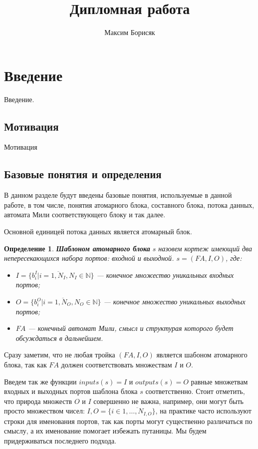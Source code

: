 \documentclass[10pt,a4paper]{article}
\author{Максим Борисяк}
\title{Дипломная работа}
\newtheorem{defen}{Определение}
\newcommand{\FA}{F\!A}
\begin{document}
\maketitle

\section{Введение}

Введение.

\subsection{Мотивация}
Мотивация

\subsection{Базовые понятия и определения}
В данном разделе будут введены базовые понятия, используемые в данной работе, в том числе,
понятия атомарного блока, составного блока, потока данных, автомата Мили соответствующего блоку и так далее.

Основной единицей потока данных является атомарный блок.
\begin{defen}
  \textbf{Шаблоном атомарного блока} $s$ назовем кортеж имеющий два непересекающихся набора портов: \textit{входной} и \textit{выходной}.
  $s = (\FA, I, O)$, где:
  \begin{itemize}
    \item $I = \{b^I_i \vert i = \overline{1, N_I}, N_I \in \mathbb{N}\}$ --- конечное множество уникальных входных портов;
    \item $O = \{b^O_i \vert i = \overline{1, N_O}, N_O \in \mathbb{N}\}$ --- конечное множество уникальных выходных портов;
    \item $\FA$ --- конечный автомат Мили, смысл и структурая которого будет обсуждаться в дальнейшем.
  \end{itemize}
\end{defen}
Сразу заметим, что не любая тройка $(\FA, I, O)$ является шабоном атомарного блока, так как $\FA$ должен соответствовать множествам $I$ и $O$.
  
Введем так же функции $inputs(s) = I$ и $outputs(s) = O$ равные множетвам входных и выходных портов шаблона блока $s$ соответственно.
Стоит отметить, что природа множеств $O$ и $I$ совершенно не важна, например, они могут быть просто множеством чисел: $I, O = \{i \in \overline{1, \dots, N_{I, O}}\}$,
на практике часто используют строки для именования портов, так как порты могут существенно различаться по смыслу, а их именование помогает избежать путаницы.
Мы будем придерживаться последнего подхода.
  
\end{document}

